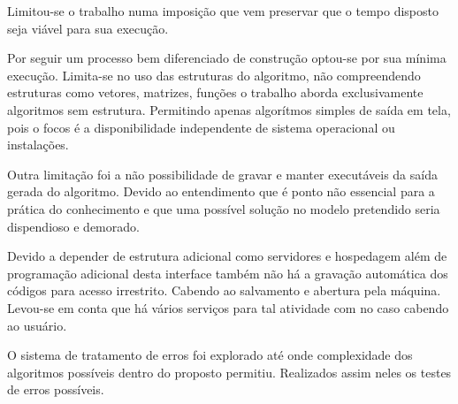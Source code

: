 \ifdraft{\color{green}}{}Limitou-se o trabalho numa imposição que vem preservar que o tempo disposto seja viável para sua execução.

Por seguir um processo bem diferenciado de construção optou-se por sua mínima execução. Limita-se no uso das  estruturas do algoritmo, não compreendendo estruturas como vetores, matrizes, funções o trabalho aborda exclusivamente algoritmos sem estrutura. Permitindo apenas algorítmos simples de saída em tela, pois o focos é a disponibilidade independente de sistema operacional ou instalações.

Outra limitação foi a não possibilidade de gravar e manter executáveis da saída gerada do algoritmo. Devido ao entendimento que é ponto não essencial para a prática do conhecimento e que uma possível solução no modelo pretendido seria dispendioso e demorado.

Devido a depender de estrutura adicional como servidores e hospedagem além de programação adicional desta interface também não há a gravação automática dos códigos para acesso irrestrito. Cabendo ao salvamento e abertura pela máquina. Levou-se em conta que há vários serviços para tal atividade com no caso cabendo ao usuário.

O sistema de tratamento de erros foi explorado até onde complexidade dos algoritmos possíveis dentro do proposto permitiu. Realizados assim neles os testes de erros possíveis.\color{black}

